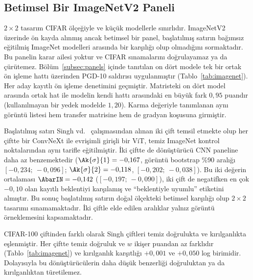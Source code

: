 \subsection{Betimsel Bir ImageNetV2 Paneli}
\label{subsec:imagenet}

$2\times2$ tasarım CIFAR ölçeğiyle ve küçük modellerle sınırlıdır. ImageNetV2~\cite{recht2019imagenet} üzerinde ön kayda alınmış ancak betimsel bir panel, başlatılmış satırın bağımsız eğitilmiş ImageNet modelleri arasında bir karşılığı olup olmadığını sormaktadır. Bu panelin karar ailesi yoktur ve CIFAR sınamalarını doğrulayamaz ya da çürütemez. Bölüm~\ref{subsec:panels} içinde tanıtılan on dört modele tek bir ortak ön işleme hattı üzerinden PGD-10 saldırısı uygulanmıştır (Tablo~\ref{tab:imagenet}). Her aday kayıtlı ön işleme denetimini geçmiştir. Matristeki on dört model arasında ortak hat ile modelin kendi hattı arasındaki en büyük fark $0{,}95$ puandır (kullanılmayan bir yedek modelde $1{,}20$). Karma değeriyle tanımlanan aynı görüntü listesi hem transfer matrisine hem de gradyan koşusuna girmiştir.

Başlatılmış satırı Singh vd.~\cite{singh2023revisiting} çalışmasından alınan iki çift temsil etmekte olup her çiftte bir ConvNeXt ile evrişimli girişli bir ViT, temiz ImageNet kontrol noktalarından aynı tarifle eğitilmiştir. İki çiftte de dönüştürücü CNN paneline daha az benzemektedir ($\Ak{\sigma}{1} = -0{,}167$, görüntü bootstrap \%90 aralığı $[-0{,}234;\ -0{,}096]$; $\Ak{\sigma}{2} = -0{,}118$, $[-0{,}202;\ -0{,}038]$). Bu iki değerin ortalaması $\AbarIN = -0{,}142$ ($[-0{,}197;\ -0{,}090]$), iki çift de negatifken en çok $-0{,}10$ olan kayıtlı beklentiyi karşılamış ve ``beklentiyle uyumlu'' etiketini almıştır. Bu sonuç başlatılmış satırın doğal ölçekteki betimsel karşılığı olup $2\times2$ tasarımı sınamamaktadır. İki çiftle elde edilen aralıklar yalnız görüntü örneklemesini kapsamaktadır.

CIFAR-100 çiftinden farklı olarak Singh çiftleri temiz doğrulukta ve kırılganlıkta eşlenmiştir. Her çiftte temiz doğruluk ve $w$ ikişer puandan az farklıdır (Tablo~\ref{tab:imagenet}) ve kırılganlık karşıtlığı $+0{,}001$ ve $+0{,}050$ log birimidir. Dolayısıyla bu dönüştürücülerin daha düşük benzerliği doğruluktan ya da kırılganlıktan türetilemez.

